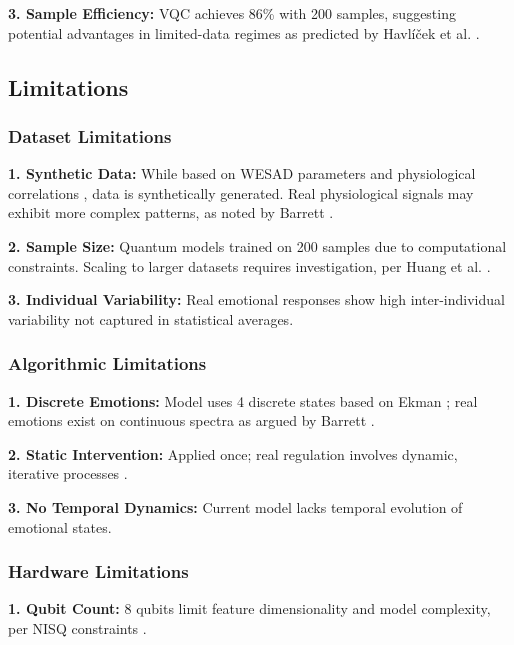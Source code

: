 \documentclass[11pt,letterpaper]{article}
\begin{document}
\textbf{3. Sample Efficiency:} VQC achieves 86\% with 200 samples, suggesting potential advantages in limited-data regimes as predicted by Havlíček et al. \cite{havlicek2019supervised}.

\subsection{Limitations}

\subsubsection{Dataset Limitations}

\textbf{1. Synthetic Data:} While based on WESAD parameters \cite{schmidt2018introducing} and physiological correlations \cite{kreibig2010autonomic}, data is synthetically generated. Real physiological signals may exhibit more complex patterns, as noted by Barrett \cite{barrett2017emotions}.

\textbf{2. Sample Size:} Quantum models trained on 200 samples due to computational constraints. Scaling to larger datasets requires investigation, per Huang et al. \cite{huang2021power}.

\textbf{3. Individual Variability:} Real emotional responses show high inter-individual variability \cite{barrett2017emotions} not captured in statistical averages.

\subsubsection{Algorithmic Limitations}

\textbf{1. Discrete Emotions:} Model uses 4 discrete states based on Ekman \cite{ekman1992argument}; real emotions exist on continuous spectra as argued by Barrett \cite{barrett2017emotions}.

\textbf{2. Static Intervention:} Applied once; real regulation involves dynamic, iterative processes \cite{gross1998antecedent}.

\textbf{3. No Temporal Dynamics:} Current model lacks temporal evolution of emotional states.

\subsubsection{Hardware Limitations}

\textbf{1. Qubit Count:} 8 qubits limit feature dimensionality and model complexity, per NISQ constraints \cite{preskill2018quantum}.
\end{document}
